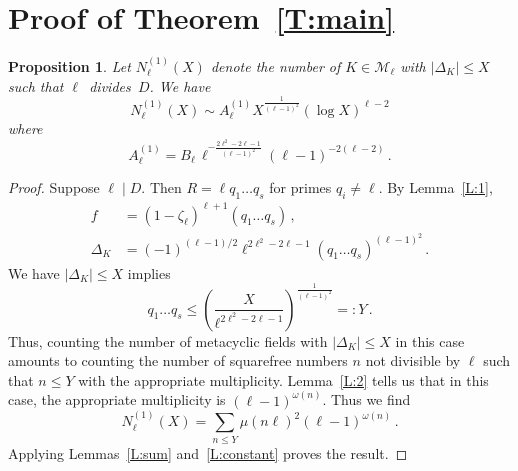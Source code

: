 \documentclass[12pt]{amsart}
\newcommand{\km}[1]{{\color{magenta}{KM: #1}} }
\newtheorem{prop}{Proposition}
\begin{document}



        



\section{Proof of Theorem~\ref{T:main}}\label{MainTheorem}

\begin{prop}\label{P:1}
Let $N_\ell^{(1)}(X)$ denote the number of $K\in\mathcal{M}_\ell$ 
with $|\Delta_K|\leq X$ such that $\ell$~divides~$D$.
We have
$$N_\ell^{(1)}(X)\sim A_\ell^{(1)} X^{\frac{1}{(\ell-1)^2}}(\log X)^{\ell-2}$$
where
$$
  A_\ell^{(1)}=B_{\ell}\,\ell^{-\frac{2\ell^2 - 2\ell -1}{(\ell-1)^2}}(\ell-1)^{-2(\ell-2)}
  \,.
$$
\end{prop}
        
\begin{proof}
Suppose $\ell\mid D$.  Then
$R = \ell q_1 \dots q_s$ for primes $q_i \neq \ell$.
By Lemma~\ref{L:1},
\begin{align*}
f &= (1-\zeta_\ell)^{\ell+1}(q_1 \dots q_s)
\,,\\
\Delta_K &= (-1)^{(\ell-1)/2}\ell^{2\ell^2-2\ell-1}(q_1 \dots q_s)^{(\ell-1)^2}
\,.
\end{align*}
We have $|\Delta_K|\leq X$ implies
$$
  q_1\dots q_s\leq \left(\frac{X}{\ell^{2\ell^2-2\ell-1}}\right)^{\frac{1}{(\ell-1)^2}}=:Y
  \,.
$$
Thus, counting the number of metacyclic fields with $|\Delta_K|\leq X$ in this case
amounts to counting the number of squarefree numbers $n$ not divisible by $\ell$
such that $n\leq Y$ with the appropriate multiplicity.  Lemma~\ref{L:2} tells us that
in this case, the appropriate multiplicity is $(\ell-1)^{\omega(n)}$.  Thus we find
$$
N_\ell^{(1)}(X)=\sum_{n\leq Y}\mu(n\ell)^2(\ell-1)^{\omega(n)}
\,.
$$
Applying Lemmas~\ref{L:sum} and~\ref{L:constant} proves the result.
\end{proof}



\end{document}
